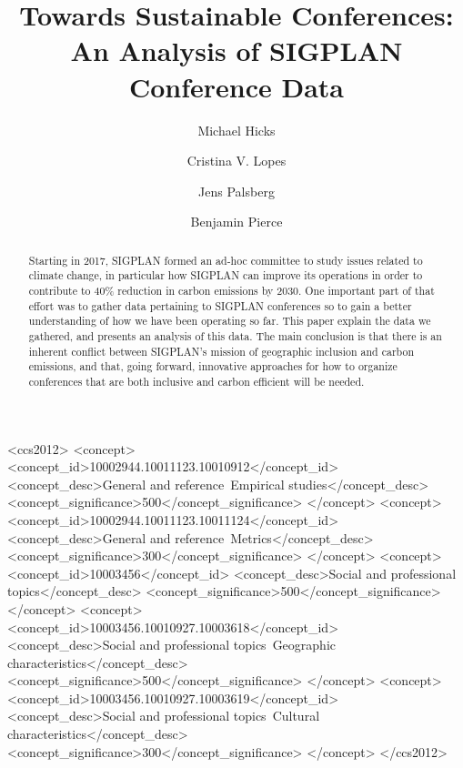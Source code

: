 \documentclass[manuscript, review, screen]{acmart}
\begin{document}
\title{Towards Sustainable Conferences: An Analysis of SIGPLAN Conference Data}

\author{Michael Hicks}
\author{Cristina V. Lopes}
\author{Jens Palsberg}
\author{Benjamin Pierce}

\renewcommand\shortauthors{SIGPLAN Climate Change Committee}

\begin{abstract}
Starting in 2017, SIGPLAN formed an ad-hoc committee to study issues related to climate change, in particular how SIGPLAN can improve its operations in order to contribute to 40\% reduction in carbon emissions by 2030. One important part of that effort was to gather data pertaining to SIGPLAN conferences so to gain a better understanding of how we have been operating so far. This paper explain the data we gathered, and presents an analysis of this data. The main conclusion is that there is an inherent conflict between SIGPLAN's mission of geographic inclusion and carbon emissions, and that, going forward, innovative approaches for how to organize conferences that are both inclusive and carbon efficient will be needed. 
\end{abstract}


%
%
\begin{CCSXML}
<ccs2012>
<concept>
<concept_id>10002944.10011123.10010912</concept_id>
<concept_desc>General and reference~Empirical studies</concept_desc>
<concept_significance>500</concept_significance>
</concept>
<concept>
<concept_id>10002944.10011123.10011124</concept_id>
<concept_desc>General and reference~Metrics</concept_desc>
<concept_significance>300</concept_significance>
</concept>
<concept>
<concept_id>10003456</concept_id>
<concept_desc>Social and professional topics</concept_desc>
<concept_significance>500</concept_significance>
</concept>
<concept>
<concept_id>10003456.10010927.10003618</concept_id>
<concept_desc>Social and professional topics~Geographic characteristics</concept_desc>
<concept_significance>500</concept_significance>
</concept>
<concept>
<concept_id>10003456.10010927.10003619</concept_id>
<concept_desc>Social and professional topics~Cultural characteristics</concept_desc>
<concept_significance>300</concept_significance>
</concept>
</ccs2012>
\end{CCSXML}
\end{document}
